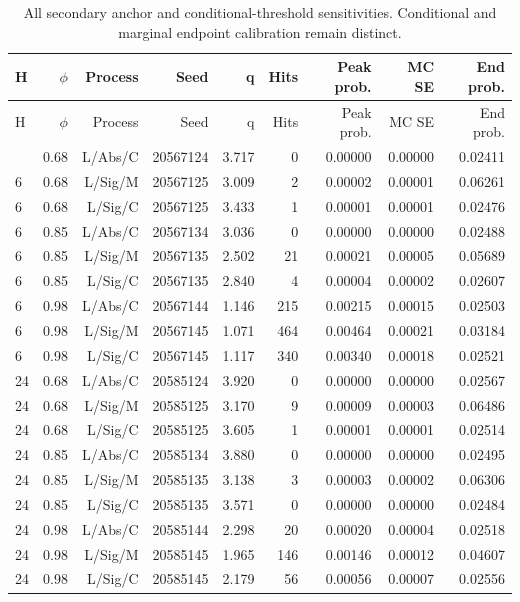 \documentclass[11pt,a4paper]{article}
\begin{document}
\begin{longtable}{lrrrrrrrr}
\caption{All secondary anchor and conditional-threshold sensitivities. Conditional and marginal endpoint calibration remain distinct.}\\
\toprule
H & \(\phi\) & Process & Seed & q & Hits & Peak prob. & MC SE & End prob. \\
\midrule
\endfirsthead
\toprule
H & \(\phi\) & Process & Seed & q & Hits & Peak prob. & MC SE & End prob. \\
\midrule
\endhead
\bottomrule
\endfoot
6 & 0.68 & L/Abs/C & 20567124 & 3.717 & 0 & 0.00000 & 0.00000 & 0.02411 \\
6 & 0.68 & L/Sig/M & 20567125 & 3.009 & 2 & 0.00002 & 0.00001 & 0.06261 \\
6 & 0.68 & L/Sig/C & 20567125 & 3.433 & 1 & 0.00001 & 0.00001 & 0.02476 \\
6 & 0.85 & L/Abs/C & 20567134 & 3.036 & 0 & 0.00000 & 0.00000 & 0.02488 \\
6 & 0.85 & L/Sig/M & 20567135 & 2.502 & 21 & 0.00021 & 0.00005 & 0.05689 \\
6 & 0.85 & L/Sig/C & 20567135 & 2.840 & 4 & 0.00004 & 0.00002 & 0.02607 \\
6 & 0.98 & L/Abs/C & 20567144 & 1.146 & 215 & 0.00215 & 0.00015 & 0.02503 \\
6 & 0.98 & L/Sig/M & 20567145 & 1.071 & 464 & 0.00464 & 0.00021 & 0.03184 \\
6 & 0.98 & L/Sig/C & 20567145 & 1.117 & 340 & 0.00340 & 0.00018 & 0.02521 \\
24 & 0.68 & L/Abs/C & 20585124 & 3.920 & 0 & 0.00000 & 0.00000 & 0.02567 \\
24 & 0.68 & L/Sig/M & 20585125 & 3.170 & 9 & 0.00009 & 0.00003 & 0.06486 \\
24 & 0.68 & L/Sig/C & 20585125 & 3.605 & 1 & 0.00001 & 0.00001 & 0.02514 \\
24 & 0.85 & L/Abs/C & 20585134 & 3.880 & 0 & 0.00000 & 0.00000 & 0.02495 \\
24 & 0.85 & L/Sig/M & 20585135 & 3.138 & 3 & 0.00003 & 0.00002 & 0.06306 \\
24 & 0.85 & L/Sig/C & 20585135 & 3.571 & 0 & 0.00000 & 0.00000 & 0.02484 \\
24 & 0.98 & L/Abs/C & 20585144 & 2.298 & 20 & 0.00020 & 0.00004 & 0.02518 \\
24 & 0.98 & L/Sig/M & 20585145 & 1.965 & 146 & 0.00146 & 0.00012 & 0.04607 \\
24 & 0.98 & L/Sig/C & 20585145 & 2.179 & 56 & 0.00056 & 0.00007 & 0.02556 \\
\end{longtable}
\endgroup
\end{document}
